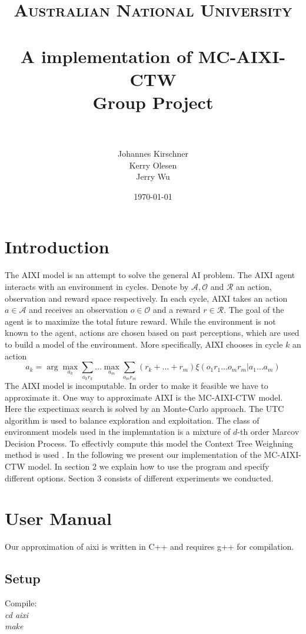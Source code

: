 \documentclass[paper=a4, fontsize=11pt]{scrartcl} %
\title{	
\normalfont \normalsize 
\textsc{Australian National University} \\ [25pt] %
\horrule{0.5pt} \\[0.4cm] %
\huge A implementation of MC-AIXI-CTW\\ Group Project \\ %
\horrule{2pt} \\[0.5cm] %
}
\author{Johannes Kirschner\\ Kerry Olesen\\ Jerry Wu} %
\date{\normalsize\today} %
\numberwithin{equation}{section} %
\numberwithin{figure}{section} %
\numberwithin{table}{section} %
\begin{document}
\maketitle %

\section{Introduction}
The AIXI model \cite{Hutter:04uaibook} is an attempt to solve the general AI problem. The AIXI agent interacts with an environment in cycles. Denote by $\mathcal{A}, \mathcal{O}$ and $\mathcal{R}$ an action, observation and reward space respectively. In each cycle, AIXI takes an action $a \in \mathcal{A}$ and receives an observation $o \in \mathcal{O}$ and a reward $r \in \mathcal{R}$. The goal of the agent is to maximize the total future reward. While the environment is not known to the agent, actions are chosen based on past perceptions, which are used to build a model of the environment. More specifically, AIXI chooses in cycle $k$ an action
\[ a_k = \arg \max_{a_k} \sum_{o_kr_k} \dots \max_{a_m} \sum_{o_m r_m} (r_k + \dots + r_m)\xi(o_1r_1\dots o_m r_m|a_1\dots a_m) \]
The AIXI model is incomputable. In order to make it feasible we have to approximate it. One way to approximate AIXI is the MC-AIXI-CTW \cite{VNHS09} model. Here the expectimax search is solved by an Monte-Carlo approach. The UTC \cite{UCT} algorithm is used to balance exploration and exploitation. The class of environment models used in the implemntation is a mixture of $d$-th order Marcov Decision Process. To effectivly compute this model the Context Tree Weighning method is used \cite{CTW}.
In the following we present our implementation of the MC-AIXI-CTW model. In section 2 we explain how to use the program and specify different options. Section 3 consists of different experiments we conducted.


\section{User Manual}

Our approximation of aixi is written in C++ and requires g++ for compilation.

\subsection{Setup}


\noindent Compile:\\
\indent \textit{cd aixi}\\
\indent \textit{make}
\end{document}
